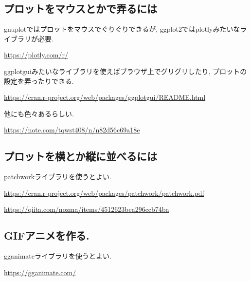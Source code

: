 \documentclass[lualatex,a4paper,12pt,report,ja=standard]{bxjsarticle}
\begin{document}
\subsection{プロットをマウスとかで弄るには}
\label{sec:orgd0349a4}
gnuplotではプロットをマウスでぐりぐりできるが, ggplot2ではplotlyみたいなライブラリが必要.

\url{https://plotly.com/r/}

ggplotguiみたいなライブラリを使えばブラウザ上でグリグリしたり, プロットの設定を弄ったりできる.

\url{https://cran.r-project.org/web/packages/ggplotgui/README.html}

他にも色々あるらしい.

\url{https://note.com/tqwst408/n/n82d56c69a18e}
\subsection{プロットを横とか縦に並べるには}
\label{sec:orga288f0a}
patchworkライブラリを使うとよい.

\url{https://cran.r-project.org/web/packages/patchwork/patchwork.pdf}

\url{https://qiita.com/nozma/items/4512623bea296ccb74ba}
\subsection{GIFアニメを作る.}
\label{sec:org19aa8f4}
gganimateライブラリを使うとよい.

\url{https://gganimate.com/}
\end{document}
